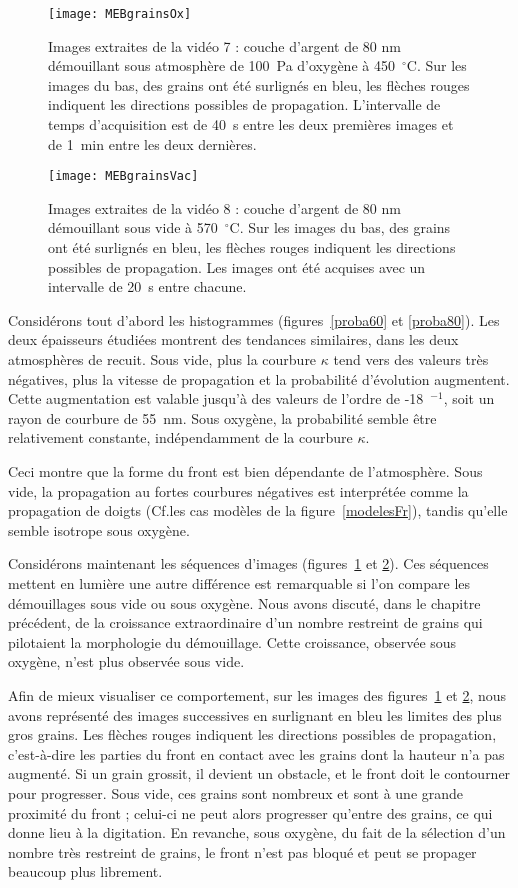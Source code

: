 {{\begin{figure}[!p]
\centering
\texttt{[image: MEBgrainsOx]}
\caption{Images extraites de la vidéo 7 : couche d’argent de 80 nm démouillant sous atmosphère de 100~Pa d’oxygène à 450~$^\circ$C. Sur les images du bas, des grains ont été surlignés en bleu, les flèches rouges indiquent les directions possibles de propagation. L'intervalle de temps d'acquisition est de 40~s entre les deux premières images et de 1~min entre les deux dernières.}
\label{MEBgrainsOx}
\end{figure}
\begin{figure}[!p]
\centering
\texttt{[image: MEBgrainsVac]}
\caption{Images extraites de la vidéo 8 : couche d’argent de 80 nm démouillant sous vide à 570~$^\circ$C. Sur les images du bas, des grains ont été surlignés en bleu, les flèches rouges indiquent les directions possibles de propagation. Les images ont été acquises avec un intervalle de 20~s entre chacune.}
\label{MEBgrainsVac}
\end{figure}
Considérons tout d'abord les histogrammes (figures~\ref{proba60} et \ref{proba80}). Les deux épaisseurs étudiées montrent des tendances similaires, dans les deux atmosphères de recuit. Sous vide, plus la courbure $\kappa$ tend vers des valeurs très négatives, plus la vitesse de propagation et la probabilité d’évolution augmentent. Cette augmentation est valable jusqu’à des valeurs de l’ordre de -18~\micro\meter$^{-1}$, soit un rayon de courbure de 55~nm. Sous oxygène, la probabilité semble être relativement constante, indépendamment de la courbure $\kappa$.\par 
Ceci montre que la forme du front est bien dépendante de l’atmosphère. Sous vide, la propagation au fortes courbures négatives est interprétée comme la propagation de doigts (Cf.les cas modèles de la figure~\ref{modelesFr}), tandis qu’elle semble isotrope sous oxygène.\par 
Considérons maintenant les séquences d'images (figures~\ref{MEBgrainsOx} et \ref{MEBgrainsVac}). Ces séquences mettent en lumière une autre différence est remarquable si l’on compare les démouillages sous vide ou sous oxygène. Nous avons discuté, dans le chapitre précédent, de la croissance extraordinaire d’un nombre restreint de grains qui pilotaient la morphologie du démouillage. Cette croissance, observée sous oxygène, n’est plus observée sous vide.\par
Afin de mieux visualiser ce comportement, sur les images des figures~\ref{MEBgrainsOx} et \ref{MEBgrainsVac}, nous avons représenté des images successives en surlignant en bleu les limites des plus gros grains. Les flèches rouges indiquent les directions possibles de propagation, c’est-à-dire les parties du front en contact avec les grains dont la hauteur n’a pas augmenté. Si un grain grossit, il devient un obstacle, et le front doit le contourner pour progresser. Sous vide, ces grains sont nombreux et sont à une grande proximité du front ; celui-ci ne peut alors progresser qu’entre des grains, ce qui donne lieu à la digitation. En revanche, sous oxygène, du fait de la sélection d’un nombre très restreint de grains, le front n’est pas bloqué et peut se propager beaucoup plus librement.\par 
}}
